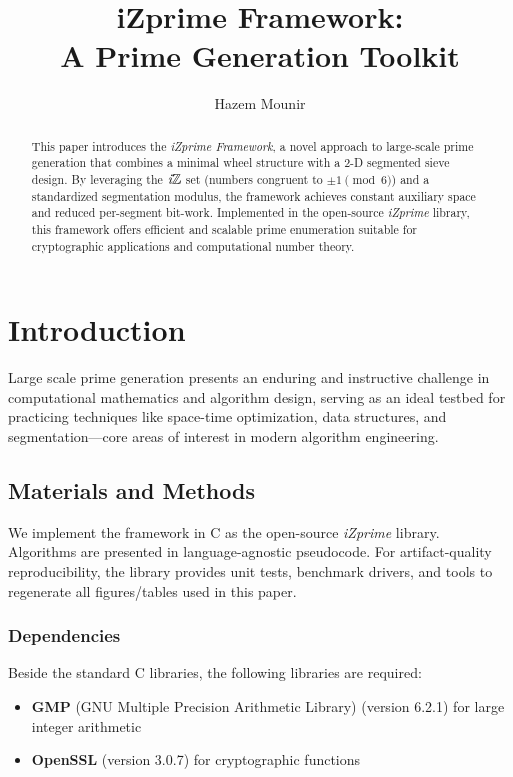 \documentclass{article}
\begin{document}


\title{iZprime Framework:\\A Prime Generation Toolkit}
\author{Hazem Mounir}
\maketitle

\begin{abstract}
This paper introduces the \emph{iZprime Framework}, a novel approach to large-scale prime generation that combines a minimal wheel structure with a 2-D segmented sieve design. By leveraging the $\textit{i}\mathbb{Z}$ set (numbers congruent to $\pm1 \pmod{6}$) and a standardized segmentation modulus, the framework achieves constant auxiliary space and reduced per-segment bit-work. Implemented in the open-source \emph{iZprime} library, this framework offers efficient and scalable prime enumeration suitable for cryptographic applications and computational number theory.
\end{abstract}

\tableofcontents
\newpage

\section{Introduction}
Large scale prime generation presents an enduring and instructive challenge in computational mathematics and algorithm design, serving as an ideal testbed for practicing techniques like space-time optimization, data structures, and segmentation—core areas of interest in modern algorithm engineering.

\subsection{Materials and Methods}
We implement the framework in C as the open-source \emph{iZprime} library. Algorithms are presented in language-agnostic pseudocode. 
For artifact-quality reproducibility, the library provides unit tests, benchmark drivers, and tools to regenerate all figures/tables used in this paper.

\subsubsection{Dependencies}
Beside the standard C libraries, the following libraries are required:
\begin{itemize}
    \item \textbf{GMP} (GNU Multiple Precision Arithmetic Library) (version 6.2.1) for large integer arithmetic
    \item \textbf{OpenSSL} (version 3.0.7) for cryptographic functions
\end{itemize}
\end{document}
